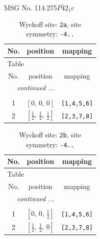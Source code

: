 \documentclass[fleqn,8pt]{jsarticle}
\begin{document}
\setcounter{MaxMatrixCols}{32}

\renewcommand{\tablename}{Table~}
\renewcommand{\figurename}{Figure~}
\begin{center}
\LARGE
MSG No. 114.275\quad$P\bar{4}2_{1}c$
\end{center}
\renewcommand{\arraystretch}{1.2}
\begin{longtable}{ccc}
\caption{Wyckoff site: {\tt 2a}, site symmetry: {\tt -4..}}
 \\
 \hline \hline
No. & position & mapping \\ \hline \endfirsthead

\multicolumn{2}{l}{\tablename\ \thetable{}} \\
 \hline \hline
No. & position & mapping \\ \hline \endhead

 \hline \hline
\multicolumn{2}{r}{\footnotesize\it continued ...} \\ \endfoot

 \hline \hline
\multicolumn{2}{r}{} \\ \endlastfoot

1 & $\left[ 0,\, 0,\, 0 \right]$ & {\tt [1,4,5,6]} \\ \hline
2 & $\left[ \frac{1}{2},\, \frac{1}{2},\, \frac{1}{2} \right]$ & {\tt [2,3,7,8]} \\
\end{longtable}
\renewcommand{\arraystretch}{1.2}
\begin{longtable}{ccc}
\caption{Wyckoff site: {\tt 2b}, site symmetry: {\tt -4..}}
 \\
 \hline \hline
No. & position & mapping \\ \hline \endfirsthead

\multicolumn{2}{l}{\tablename\ \thetable{}} \\
 \hline \hline
No. & position & mapping \\ \hline \endhead

 \hline \hline
\multicolumn{2}{r}{\footnotesize\it continued ...} \\ \endfoot

 \hline \hline
\multicolumn{2}{r}{} \\ \endlastfoot

1 & $\left[ 0,\, 0,\, \frac{1}{2} \right]$ & {\tt [1,4,5,6]} \\ \hline
2 & $\left[ \frac{1}{2},\, \frac{1}{2},\, 0 \right]$ & {\tt [2,3,7,8]} \\
\end{longtable}
\end{document}
